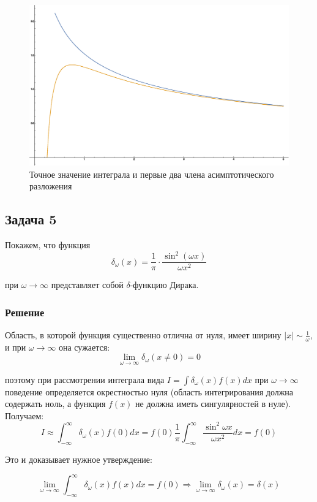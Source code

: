 \documentclass[a4paper,12pt]{article}
\begin{document}
\begin{figure}[h]
\caption{Точное значение интеграла и первые два члена асимптотического разложения}
\centering
\includegraphics[width=0.65\columnwidth]{besselk.eps}
\end{figure}





\subsection*{Задача 5}

Покажем, что функция 
\[
\delta_{\omega}(x)=\frac{1}{\pi}\cdot\frac{\sin^{2}(\omega x)}{\omega x^{2}}
\]

\noindent
при $\omega\to\infty$ представляет собой $\delta$-функцию Дирака.


\subsubsection*{Решение}

Область, в которой функция существенно отлична от нуля, имеет ширину
$\left|x\right|\sim\frac{1}{\omega}$, и при $\omega\to\infty$ она
сужается:
\[
\lim_{\omega\to\infty}\delta_{\omega}(x\neq0)=0
\]

\noindent
поэтому при рассмотрении интеграла вида $I=\int\delta_{\omega}(x)f(x)dx$
при $\omega\to\infty$ поведение определяется окрестностью нуля (область
интегрирования должна содержать ноль, а функция $f\left(x\right)$
не должна иметь сингулярностей в нуле). Получаем:
\[
I\approx\int_{-\infty}^{\infty}\delta_{\omega}(x)f(0)dx=f(0)\frac{1}{\pi}\int_{-\infty}^{\infty}\frac{\sin^{2}\omega x}{\omega x^{2}}dx=f(0)
\]

\noindent
Это и доказывает нужное утверждение:

\[
\lim_{\omega\to\infty}\int_{-\infty}^{\infty}\delta_{\omega}(x)f(x)dx=f(0)\Rightarrow\lim_{\omega\to\infty}\delta_{\omega}(x)=\delta(x)
\]
\end{document}
